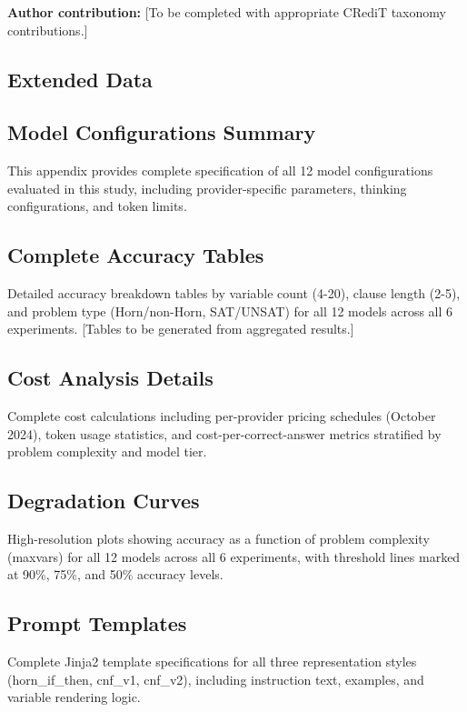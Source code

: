 \documentclass[pdflatex,sn-mathphys-num]{sn-jnl}%
\theoremstyle{thmstyleone}%
\theoremstyle{thmstyletwo}%
\theoremstyle{thmstylethree}%
\begin{document}
\textbf{Author contribution:} [To be completed with appropriate CRediT taxonomy contributions.]

\begin{appendices}

\section{Extended Data}\label{secA1}

\subsection{Model Configurations Summary}

This appendix provides complete specification of all 12 model configurations evaluated in this study, including provider-specific parameters, thinking configurations, and token limits.

\subsection{Complete Accuracy Tables}

Detailed accuracy breakdown tables by variable count (4-20), clause length (2-5), and problem type (Horn/non-Horn, SAT/UNSAT) for all 12 models across all 6 experiments. [Tables to be generated from aggregated results.]

\subsection{Cost Analysis Details}

Complete cost calculations including per-provider pricing schedules (October 2024), token usage statistics, and cost-per-correct-answer metrics stratified by problem complexity and model tier.

\subsection{Degradation Curves}

High-resolution plots showing accuracy as a function of problem complexity (maxvars) for all 12 models across all 6 experiments, with threshold lines marked at 90\%, 75\%, and 50\% accuracy levels.

\subsection{Prompt Templates}

Complete Jinja2 template specifications for all three representation styles (horn\_if\_then, cnf\_v1, cnf\_v2), including instruction text, examples, and variable rendering logic.

\end{appendices}
\end{document}
